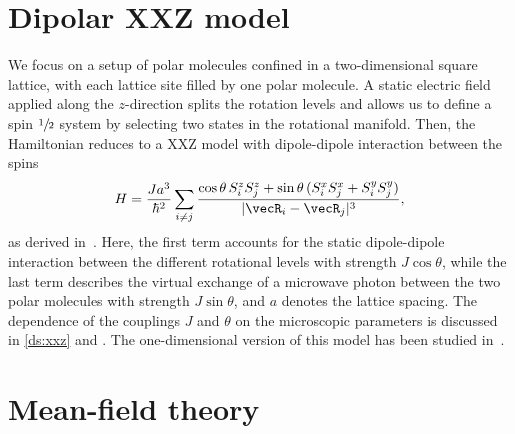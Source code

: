 \section{Dipolar XXZ model}

We focus on a setup of polar molecules confined in a two-dimensional square lattice,
with each lattice site filled by one polar molecule. A static electric field applied along
the $z$-direction splits the rotation levels and allows us to define a spin $\sfrac{1}{2}$ system by selecting
two states in the rotational manifold.
Then, the Hamiltonian reduces to a XXZ model with dipole-dipole interaction between the spins~\cite{Gorshkov2011,Muller2009}
\begin{align}
H = \frac{J a^3}{\hbar^2} \sum_{i \neq j} \frac{\cos \theta \,
S^{z}_{i}S^{z}_{j}+ \sin \theta
\, ( S^{x}_{i} S^{x}_{j} + S^{y}_{i} S^{y}_{j} ) }{|\vecR_{i} - \vecR_{j}|^3},
\end{align}
%
as derived in~. Here, the first term accounts for the static dipole-dipole
interaction between the different rotational levels with strength $J \cos \theta$, while the last term
describes the virtual exchange of a microwave photon between the two polar molecules with
strength $J \sin \theta$, and $a$ denotes the lattice spacing.
The dependence of the couplings $J$ and $\theta$ on the microscopic
parameters is discussed in \cref{ds:xxz} and . The one-dimensional version of this model has been studied in~\cite{Hauke2010}.

\section{Mean-field theory}

